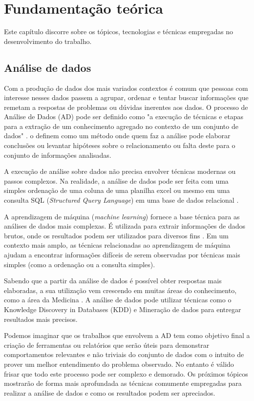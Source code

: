 \chapter{Fundamentação teórica}

Este capítulo discorre sobre os tópicos, tecnologias e técnicas empregadas no desenvolvimento do trabalho.

\section{Análise de dados}

Com a produção de dados dos mais variados contextos é comum que pessoas com interesse nesses dados passem a agrupar, ordenar e tentar buscar informações que remetam a respostas de problemas ou dúvidas inerentes aos dados. O processo de Análise de Dados (AD) pode ser definido como "a execução de técnicas e etapas para a extração de um conhecimento agregado no contexto de um conjunto de dados" \cite{AMARAL2016}.  o definem como um método onde quem faz a análise pode elaborar conclusões ou levantar hipóteses sobre o relacionamento ou falta deste para o conjunto de informações analisadas.

A execução de análise sobre dados não precisa envolver técnicas modernas ou passos complexos. Na realidade, a análise de dados pode ser feita com uma simples ordenação de uma coluna de uma planilha excel ou mesmo em uma consulta SQL (\textit{Structured Query Language}) em uma base de dados relacional \cite{AMARAL2016}. 

A aprendizagem de máquina (\emph{machine learning}) fornece a base técnica para as análises de dados mais complexas. É utilizada para extrair informações de dados brutos, onde os resultados podem ser utilizados para diversos fins \cite{Witten2016}. Em um contexto mais amplo, as técnicas relacionadas ao aprendizagem de máquina ajudam a encontrar informações difíceis de serem observadas por técnicas mais simples (como a ordenação ou a consulta simples).

Sabendo que a partir da análise de dados é possível obter respostas mais elaboradas, a sua utilização vem crescendo em muitas áreas do conhecimento, como a área da Medicina \cite{Holzinger2014}. A análise de dados pode utilizar técnicas como o Knowledge Discovery in Databases (KDD) \cite{Holzinger2014} e Mineração de dados \cite{Aggarwal2015} para entregar resultados mais precisos.

Podemos imaginar que os trabalhos que envolvem a AD tem como objetivo final a criação de ferramentas ou relatórios que serão úteis para demonstrar comportamentos relevantes e não triviais do conjunto de dados com o intuito de prover um melhor entendimento do problema observado. No entanto é válido frisar que todo este processo pode ser complexo e demorado. Os próximos tópicos mostrarão de forma mais aprofundada as técnicas comumente empregadas para realizar a análise de dados e como os resultados podem ser apreciados.


